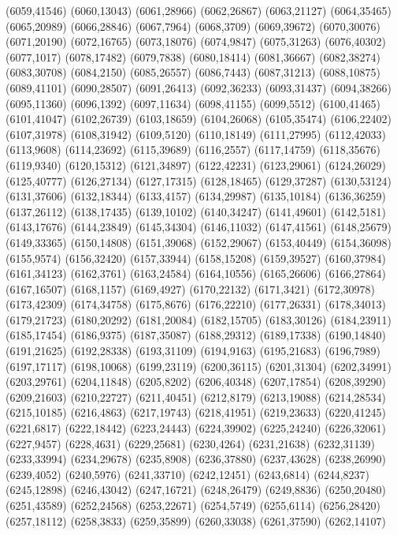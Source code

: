 (6059,41546)
(6060,13043)
(6061,28966)
(6062,26867)
(6063,21127)
(6064,35465)
(6065,20989)
(6066,28846)
(6067,7964)
(6068,3709)
(6069,39672)
(6070,30076)
(6071,20190)
(6072,16765)
(6073,18076)
(6074,9847)
(6075,31263)
(6076,40302)
(6077,1017)
(6078,17482)
(6079,7838)
(6080,18414)
(6081,36667)
(6082,38274)
(6083,30708)
(6084,2150)
(6085,26557)
(6086,7443)
(6087,31213)
(6088,10875)
(6089,41101)
(6090,28507)
(6091,26413)
(6092,36233)
(6093,31437)
(6094,38266)
(6095,11360)
(6096,1392)
(6097,11634)
(6098,41155)
(6099,5512)
(6100,41465)
(6101,41047)
(6102,26739)
(6103,18659)
(6104,26068)
(6105,35474)
(6106,22402)
(6107,31978)
(6108,31942)
(6109,5120)
(6110,18149)
(6111,27995)
(6112,42033)
(6113,9608)
(6114,23692)
(6115,39689)
(6116,2557)
(6117,14759)
(6118,35676)
(6119,9340)
(6120,15312)
(6121,34897)
(6122,42231)
(6123,29061)
(6124,26029)
(6125,40777)
(6126,27134)
(6127,17315)
(6128,18465)
(6129,37287)
(6130,53124)
(6131,37606)
(6132,18344)
(6133,4157)
(6134,29987)
(6135,10184)
(6136,36259)
(6137,26112)
(6138,17435)
(6139,10102)
(6140,34247)
(6141,49601)
(6142,5181)
(6143,17676)
(6144,23849)
(6145,34304)
(6146,11032)
(6147,41561)
(6148,25679)
(6149,33365)
(6150,14808)
(6151,39068)
(6152,29067)
(6153,40449)
(6154,36098)
(6155,9574)
(6156,32420)
(6157,33944)
(6158,15208)
(6159,39527)
(6160,37984)
(6161,34123)
(6162,3761)
(6163,24584)
(6164,10556)
(6165,26606)
(6166,27864)
(6167,16507)
(6168,1157)
(6169,4927)
(6170,22132)
(6171,3421)
(6172,30978)
(6173,42309)
(6174,34758)
(6175,8676)
(6176,22210)
(6177,26331)
(6178,34013)
(6179,21723)
(6180,20292)
(6181,20084)
(6182,15705)
(6183,30126)
(6184,23911)
(6185,17454)
(6186,9375)
(6187,35087)
(6188,29312)
(6189,17338)
(6190,14840)
(6191,21625)
(6192,28338)
(6193,31109)
(6194,9163)
(6195,21683)
(6196,7989)
(6197,17117)
(6198,10068)
(6199,23119)
(6200,36115)
(6201,31304)
(6202,34991)
(6203,29761)
(6204,11848)
(6205,8202)
(6206,40348)
(6207,17854)
(6208,39290)
(6209,21603)
(6210,22727)
(6211,40451)
(6212,8179)
(6213,19088)
(6214,28534)
(6215,10185)
(6216,4863)
(6217,19743)
(6218,41951)
(6219,23633)
(6220,41245)
(6221,6817)
(6222,18442)
(6223,24443)
(6224,39902)
(6225,24240)
(6226,32061)
(6227,9457)
(6228,4631)
(6229,25681)
(6230,4264)
(6231,21638)
(6232,31139)
(6233,33994)
(6234,29678)
(6235,8908)
(6236,37880)
(6237,43628)
(6238,26990)
(6239,4052)
(6240,5976)
(6241,33710)
(6242,12451)
(6243,6814)
(6244,8237)
(6245,12898)
(6246,43042)
(6247,16721)
(6248,26479)
(6249,8836)
(6250,20480)
(6251,43589)
(6252,24568)
(6253,22671)
(6254,5749)
(6255,6114)
(6256,28420)
(6257,18112)
(6258,3833)
(6259,35899)
(6260,33038)
(6261,37590)
(6262,14107)
